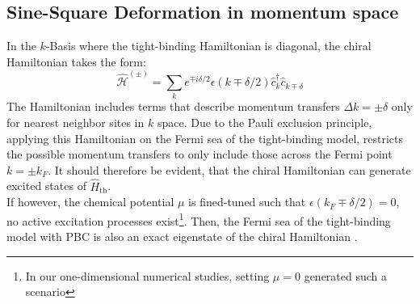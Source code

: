 \documentclass[11pt, a4paper, oneside]{book}
\theoremstyle{definition} %
\begin{document}
\subsection{Sine-Square Deformation in momentum space}
In the $k$-Basis where the tight-binding Hamiltonian is diagonal, the chiral Hamiltonian takes the form:
\begin{equation}
	\hat{\mathcal{H}}^{(\pm)} = \sum_k e^{\mp i \delta/2} \epsilon(k \mp \delta/2) \hat{c}_k^\dagger \hat{c}_{k \mp \delta}
\end{equation}
The Hamiltonian includes terms that describe momentum transfers $\Delta k = \pm \delta$ only for nearest neighbor sites in $k$ space. Due to the Pauli exclusion principle, applying this Hamiltonian on the Fermi sea of the tight-binding model, restricts the possible momentum transfers to only include those across the Fermi point $k = \pm k_F$. It should therefore be evident, that the chiral Hamiltonian can generate excited states of $\hat{H}_{\text{tb}}$\cite{Hotta}. \\

If however, the chemical potential $\mu$ is fined-tuned such that $\epsilon(k_F \mp \delta/2) = 0$, no active excitation processes exist\footnote{In our one-dimensional numerical studies, setting $\mu = 0$ generated such a scenario}. Then, the Fermi sea of the tight-binding model with PBC is also an exact eigenstate of the chiral Hamiltonian \cite{Maruyama}.\\
\end{document}
